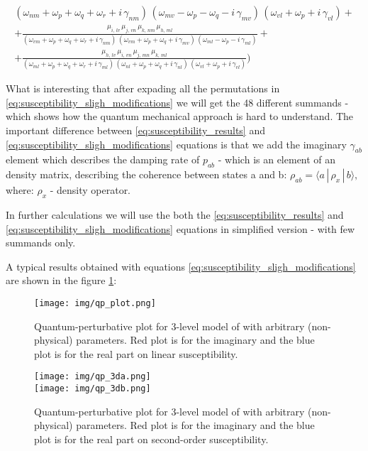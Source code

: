 \documentclass[12pt,twoside,a4paper]{article}
\numberwithin{equation}{subsection}
\numberwithin{figure}{subsection}
\begin{document}
\begin{subequations}
\begin{alignat*}{1}
     {({\omega_{nm}} + {\omega_{p}} + {\omega_{q}} + {\omega_{r}} + i\,{\gamma_{nm}})\,
      ({\omega_{mv}} - {\omega_{p}} - {\omega_{q}} - i\,{\gamma_{mv}})\,
      ({\omega_{vl}} + {\omega_{p}} + i\,{\gamma_{vl}})} 
+\\ +\frac {{\mu_{i,\,lv}}\,{\mu_{j,\,vn}}\,{\mu_{k,\,nm}}\,{\mu_{h,\,ml}}}
     {({\omega_{vm}} + {\omega_{p}} + {\omega_{q}} + {\omega_{r}} + i\,{\gamma_{nm}})\,
      ({\omega_{vm}} + {\omega_{p}} + {\omega_{q}} + i\,{\gamma_{mv}})\,
      ({\omega_{ml}} - {\omega_{p}} - i\,{\gamma_{ml}})} 
+\\ +\frac {{\mu_{h, \,lv}}\,{\mu_{i,\,vn}}\,{\mu_{j,\,mn}}\,{\mu_{k,\,ml}}}
     {({\omega_{ml}} + {\omega_{p}} + {\omega_{q}} + {\omega_{r}} + i\,{\gamma_{ml}})\,
      ({\omega_{nl}} + {\omega_{p}} + {\omega_{q}} + i\,{\gamma_{nl}})\,
      ({\omega_{vl}} + {\omega_{p}} + i\,{\gamma_{vl}})})
  \end{alignat*}
\end{subequations}

What is interesting that after expading all the permutations in \ref{eq:susceptibility_sligh_modifications} we will get the 48
different summands - which shows how the quantum mechanical approach is hard to understand. The important difference between
\ref{eq:susceptibility_results} and \ref{eq:susceptibility_sligh_modifications} equations is that we add the imaginary
${\gamma_{ab}}$ element which describes the damping rate of ${p_{ab}}$ - which is an element of an density matrix, describing the
coherence between states a and b: ${\rho_{ab}}=\langle a\, | \,{\rho_{x}}\, | \,b \rangle, $ where: ${\rho_{x}}$ - density
operator.

In further calculations we will use the both the \ref{eq:susceptibility_results} and \ref{eq:susceptibility_sligh_modifications}
equations in simplified version - with few summands only.

A typical results obtained with equations \ref{eq:susceptibility_sligh_modifications} are shown in the figure \ref{fig:qp_plot}:

\begin{figure} 
  \texttt{[image: img/qp\_plot.png]}
  \caption{Quantum-perturbative plot for 3-level model of with arbitrary (non-physical) parameters. Red plot is for the imaginary
  and the blue plot is for the real part on linear susceptibility.
  \label{fig:qp_plot}}
\end{figure}
\begin{figure} 
  \texttt{[image: img/qp\_3da.png]} \\
  \texttt{[image: img/qp\_3db.png]}
  \caption{Quantum-perturbative plot for 3-level model of with arbitrary (non-physical) parameters. Red plot is for the imaginary
  and the blue plot is for the real part on second-order susceptibility.
  \label{fig:qp_3d}}
\end{figure}
  
\end{document}
